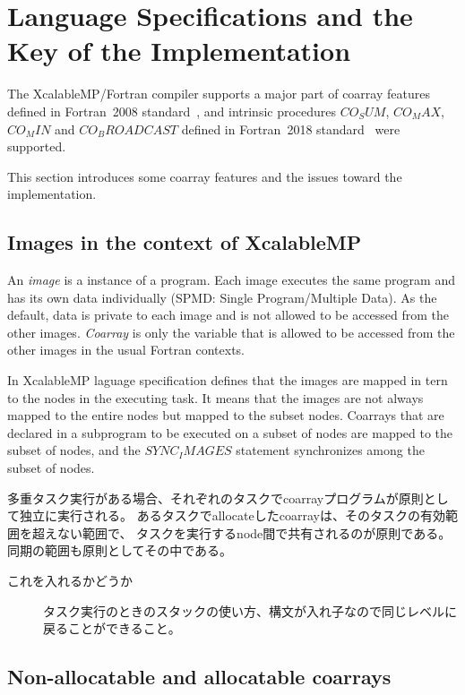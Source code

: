 \section{Language Specifications and the Key of the Implementation}\label{sec:lang}

The XcalableMP/Fortran compiler supports a major part of coarray features defined in 
Fortran~2008 standard~\cite{F08}, and intrinsic procedures 
$CO_SUM$, $CO_MAX$, $CO_MIN$ and $CO_BROADCAST$ defined in Fortran~2018 standard~\cite{F18} 
were supported.

This section introduces some coarray features and the issues toward the implementation.

\subsection{Images in the context of XcalableMP}
An {\em image} is a instance of a program. 
Each image executes the same program and has its own data individually 
(SPMD: Single Program/Multiple Data).
As the default, data is private to each image and is not allowed to be accessed
from the other images. {\em Coarray} is only the variable that is allowed to be
accessed from the other images in the usual Fortran contexts.

In XcalableMP laguage specification defines that the images are mapped 
in tern to the nodes in the executing task.
It means that the images are not always mapped to the entire nodes but mapped
to the subset nodes. Coarrays that are declared in a subprogram to be executed 
on a subset of nodes are mapped to the subset of nodes, and
the $SYNC_IMAGES$ statement synchronizes among the subset of nodes.

多重タスク実行がある場合、それぞれのタスクでcoarrayプログラムが原則として独立に実行される。
あるタスクでallocateしたcoarrayは、そのタスクの有効範囲を超えない範囲で、
タスクを実行するnode間で共有されるのが原則である。同期の範囲も原則としてその中である。

\begin{description}
\item[これを入れるかどうか]
タスク実行のときのスタックの使い方、構文が入れ子なので同じレベルに戻ることができること。
\end{description}


\subsection{Non-allocatable and allocatable coarrays}

